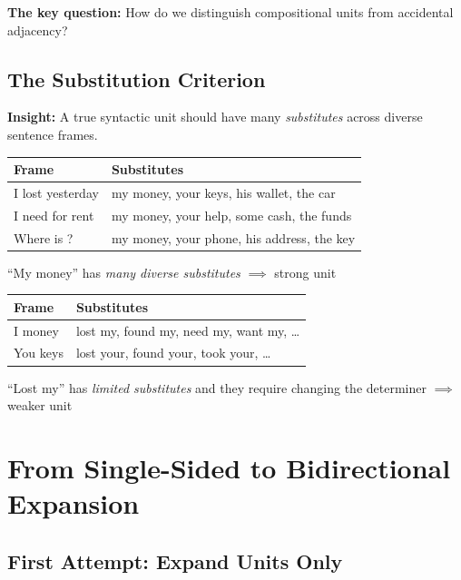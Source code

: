 \documentclass[11pt]{article}
\begin{document}
\textbf{The key question:} How do we distinguish compositional units from accidental adjacency?

\subsection{The Substitution Criterion}

\textbf{Insight:} A true syntactic unit should have many \emph{substitutes} across diverse sentence frames.

\begin{center}
\begin{tabular}{l|l}
\textbf{Frame} & \textbf{Substitutes} \\
\hline
I lost \underline{\phantom{my money}} yesterday & my money, your keys, his wallet, the car \\
I need \underline{\phantom{my money}} for rent & my money, your help, some cash, the funds \\
Where is \underline{\phantom{my money}}? & my money, your phone, his address, the key \\
\end{tabular}
\end{center}

``My money'' has \emph{many diverse substitutes} $\implies$ strong unit

\begin{center}
\begin{tabular}{l|l}
\textbf{Frame} & \textbf{Substitutes} \\
\hline
I \underline{\phantom{lost my}} money & lost my, found my, need my, want my, \ldots \\
You \underline{\phantom{lost my}} keys & lost your, found your, took your, \ldots \\
\end{tabular}
\end{center}

``Lost my'' has \emph{limited substitutes} and they require changing the determiner $\implies$ weaker unit

\section{From Single-Sided to Bidirectional Expansion}

\subsection{First Attempt: Expand Units Only}
\end{document}
